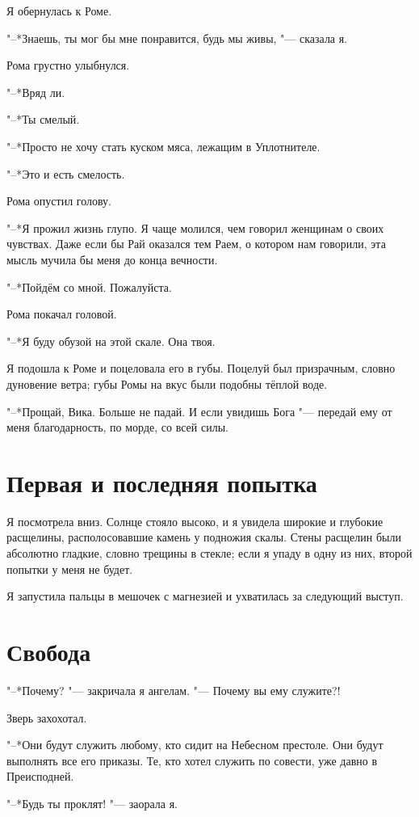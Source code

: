 Я обернулась к Роме.

"--*Знаешь, ты мог бы мне понравится, будь мы живы, "--- сказала я.

Рома грустно улыбнулся.

"--*Вряд ли.

"--*Ты смелый.

"--*Просто не хочу стать куском мяса, лежащим в Уплотнителе.

"--*Это и есть смелость.

Рома опустил голову.

"--*Я прожил жизнь глупо.
Я чаще молился, чем говорил женщинам о своих чувствах.
Даже если бы Рай оказался тем Раем, о котором нам говорили, эта мысль мучила бы меня до конца вечности.

"--*Пойдём со мной.
Пожалуйста.

Рома покачал головой.

"--*Я буду обузой на этой скале.
Она твоя.

Я подошла к Роме и поцеловала его в губы.
Поцелуй был призрачным, словно дуновение ветра;
губы Ромы на вкус были подобны тёплой воде.

"--*Прощай, Вика.
Больше не падай.
И если увидишь Бога "--- передай ему от меня благодарность, по морде, со всей силы.

\section{Первая и последняя попытка}

Я посмотрела вниз.
Солнце стояло высоко, и я увидела широкие и глубокие расщелины, располосовавшие камень у подножия скалы.
Стены расщелин были абсолютно гладкие, словно трещины в стекле;
если я упаду в одну из них, второй попытки у меня не будет.

Я запустила пальцы в мешочек с магнезией и ухватилась за следующий выступ.

\section{Свобода}

"--*Почему? "--- закричала я ангелам.
"--- Почему вы ему служите?!

Зверь захохотал.

"--*Они будут служить любому, кто сидит на Небесном престоле.
Они будут выполнять все его приказы.
Те, кто хотел служить по совести, уже давно в Преисподней.

"--*Будь ты проклят! "--- заорала я.

